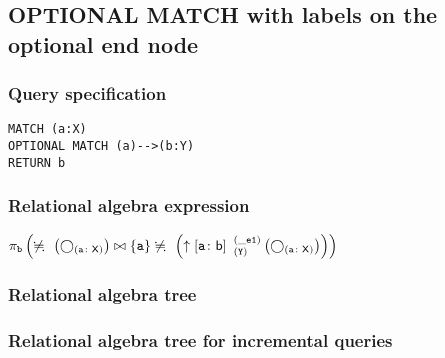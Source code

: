 \subsection{OPTIONAL MATCH with labels on the optional end node}

\subsubsection*{Query specification}

\begin{lstlisting}
MATCH (a:X)
OPTIONAL MATCH (a)-->(b:Y)
RETURN b
\end{lstlisting}

\subsubsection*{Relational algebra expression}

$\projection{\var{b}} \left(\alldifferent{} \left(\getvertices{a}{X}\right) \join \{\var{a}\} \alldifferent{} \left(\expandout{a}{b}{Y}{\_e1}{} \left(\getvertices{a}{X}\right)\right)\right)$

\subsubsection*{Relational algebra tree}


\subsubsection*{Relational algebra tree for incremental queries}


